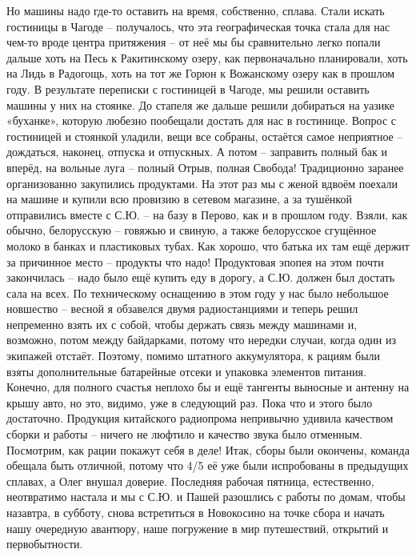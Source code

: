 Но машины надо где-то оставить на время, собственно, сплава. Стали искать гостиницы в Чагоде – получалось, что эта географическая точка стала для нас чем-то вроде центра притяжения – от неё мы бы сравнительно легко попали дальше хоть на Песь к Ракитинскому озеру, как первоначально планировали, хоть на Лидь в Радогощь, хоть на тот же Горюн к Вожанскому озеру как в прошлом году. В результате переписки с гостиницей в Чагоде, мы решили оставить машины у них на стоянке. До стапеля же дальше решили добираться на уазике «буханке», которую любезно пообещали достать для нас в гостинице. 
Вопрос с гостиницей и стоянкой уладили, вещи все собраны, остаётся самое неприятное – дождаться, наконец, отпуска и отпускных. А потом – заправить полный бак и вперёд, на вольные луга – полный Отрыв, полная Свобода! 
Традиционно заранее организованно закупились продуктами. На этот раз мы с женой вдвоём поехали на машине и купили всю провизию в сетевом магазине, а за тушёнкой отправились вместе с С.Ю. – на базу в Перово, как и в прошлом году. Взяли, как обычно, белорусскую – говяжью и свиную, а также белорусское сгущённое молоко в банках и пластиковых тубах. Как хорошо, что батька их там ещё держит за причинное место – продукты что надо! Продуктовая эпопея на этом почти закончилась – надо было ещё купить еду в дорогу, а С.Ю. должен был достать сала на всех.
По техническому оснащению в этом году у нас было небольшое новшество – весной я обзавелся двумя радиостанциями и теперь решил непременно взять их с собой, чтобы держать связь между машинами и, возможно, потом между байдарками, потому что нередки случаи, когда один из экипажей отстаёт. Поэтому, помимо штатного аккумулятора, к рациям были взяты дополнительные батарейные отсеки и упаковка элементов питания. Конечно, для полного счастья неплохо бы и ещё тангенты выносные и антенну на крышу авто, но это, видимо, уже в следующий раз. Пока что и этого было достаточно. Продукция китайского радиопрома непривычно удивила качеством сборки и работы – ничего не люфтило и качество звука было отменным. Посмотрим, как рации покажут себя в деле!
Итак, сборы были окончены, команда обещала быть отличной, потому что 4/5 её уже были испробованы в предыдущих сплавах, а Олег внушал доверие. Последняя рабочая пятница, естественно, неотвратимо настала и мы с С.Ю. и Пашей разошлись с работы по домам, чтобы назавтра, в субботу, снова встретиться в Новокосино на точке сбора и начать нашу очередную авантюру, наше погружение в мир путешествий, открытий и первобытности.

\begin{center}
\end{center}
